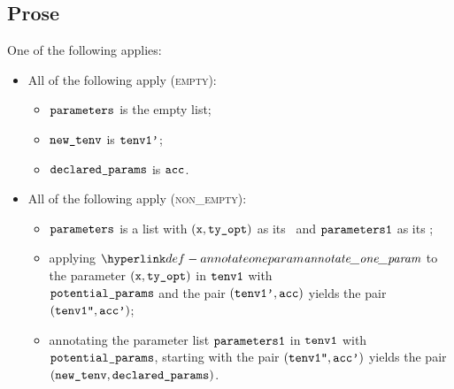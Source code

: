 
\subsection{Prose}
One of the following applies:
\begin{itemize}
  \item All of the following apply (\textsc{empty}):
  \begin{itemize}
    \item $\texttt{parameters}$ is the empty list;
    \item $\texttt{new\_tenv}$ is $\texttt{tenv1'}$;
    \item $\texttt{declared\_params}$ is $\texttt{acc}$.
  \end{itemize}

  \item All of the following apply (\textsc{non\_empty}):
  \begin{itemize}
    \item $\texttt{parameters}$ is a list with $(\texttt{x}, \texttt{ty\_opt})$ as its \head\ and $\texttt{parameters1}$ as its \tail;
    \item applying $\annotateoneparam$ to the parameter $(\texttt{x}, \texttt{ty\_opt})$ in $\texttt{tenv1}$ with \\
          $\texttt{potential\_params}$ and the pair $(\texttt{tenv1'}, \texttt{acc})$
          yields the pair \\
          $(\texttt{tenv1''}, \texttt{acc'})$\ProseOrTypeError;
    \item annotating the parameter list $\texttt{parameters1}$ in $\texttt{tenv1}$ with $\texttt{potential\_params}$, starting with the pair
          $(\texttt{tenv1''}, \texttt{acc'})$ yields the pair \\ $(\texttt{new\_tenv}, \texttt{declared\_params})$.
  \end{itemize}
\end{itemize}

